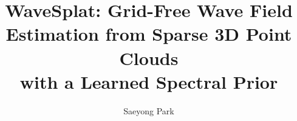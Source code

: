 \documentclass[review]{elsarticle}
\begin{document}
\begin{frontmatter}

\title{WaveSplat: Grid-Free Wave Field Estimation from Sparse 3D Point Clouds\\with a Learned Spectral Prior}

\author[avikus]{Saeyong Park}
\address[avikus]{Avikus (HD Hyundai), Republic of Korea}


\end{frontmatter}
\end{document}

